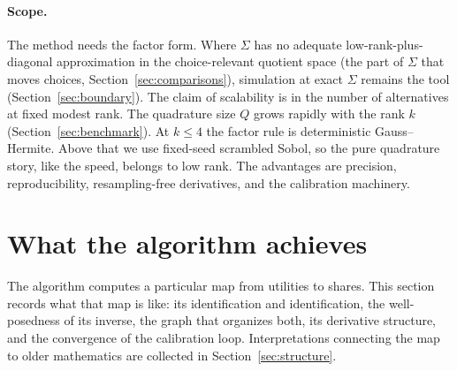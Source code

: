 \documentclass[12pt]{article}
\theoremstyle{remark}
\begin{document}
\paragraph{Scope.} The method needs the factor form. Where $\Sigma$ has no
adequate low-rank-plus-diagonal approximation in the choice-relevant
quotient space (the part of $\Sigma$ that moves choices,
Section~\ref{sec:comparisons}), simulation at exact $\Sigma$ remains the tool
(Section~\ref{sec:boundary}). The claim of scalability is in the
number of alternatives at fixed modest rank. The quadrature size $Q$
grows rapidly with the rank $k$ (Section~\ref{sec:benchmark}). At $k
\le 4$ the factor rule is deterministic Gauss--Hermite. Above that we
use fixed-seed scrambled Sobol, so the pure quadrature story, like the
speed, belongs to low rank. The
advantages are precision,
reproducibility, resampling-free derivatives, and the calibration
machinery.

\section{What the algorithm achieves}\label{sec:theory}

The algorithm computes a particular map from utilities to shares. This
section records what that map is like: its identification and
identification, the well-posedness of its inverse, the graph that
organizes both, its derivative structure, and the convergence of the
calibration loop. Interpretations connecting the map to older
mathematics are collected in Section~\ref{sec:structure}.
\end{document}
